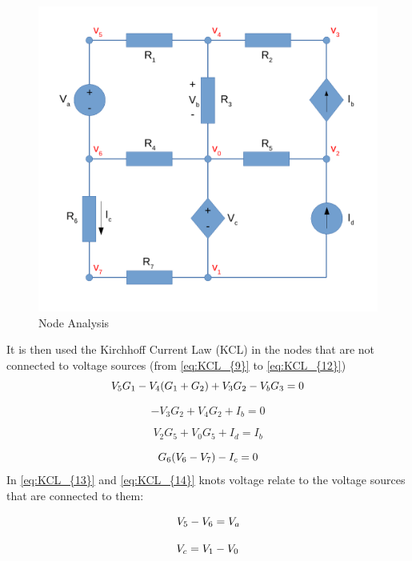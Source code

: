 \begin{figure}[h] \centering
\includegraphics[width=0.4\linewidth]{NodeAnalysis.pdf}
\caption{Node Analysis}
\label{fig:NodeAnalysis}
\end{figure}

\vspace{2cm}

It is then used the Kirchhoff Current Law (KCL) in the nodes that are not connected to voltage sources (from \ref{eq:KCL_{9}} to \ref{eq:KCL_{12}})
\vspace{0.5cm}
\begin{equation}
    V_{5} G_{1} - V_{4} (G_{1} + G_{2}) + V_{3} G_{2} - V_{b} G_{3} = 0
    \label{eq:KCL_{9}}
\end{equation}

\begin{equation}
    -V_{3} G_{2} + V_{4} G_{2} + I_{b} = 0
\end{equation}

\begin{equation}
    V_{2} G_{5} + V_{0} G_{5} + I_{d} = I_{b}
\end{equation}

\begin{equation}
    G_{6} (V_{6} - V_{7}) - I_{c} = 0
    \label{eq:KCL_{12}}
\end{equation}
\vspace{0.5cm}
In \ref{eq:KCL_{13}} and \ref{eq:KCL_{14}} knots voltage relate to the voltage sources that are connected to them:

\vspace{0.5cm}

\begin{equation}
    V_{5} - V_{6} = V_{a}
    \label{eq:KCL_{13}}
\end{equation}

\begin{equation}
    V_{c} = V_{1} - V_{0}
    \label{eq:KCL_{14}}
\end{equation}



